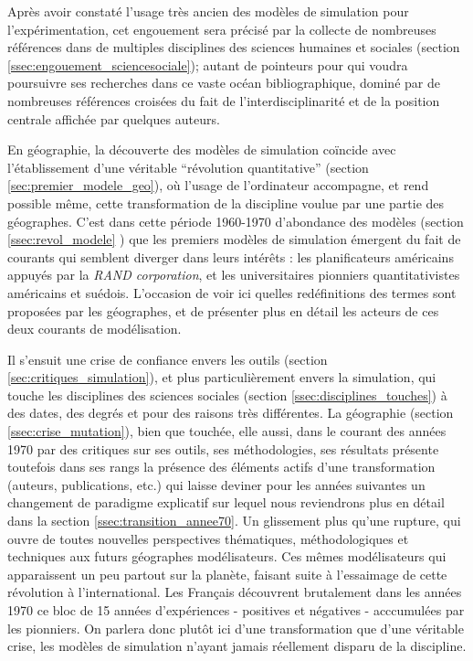Après avoir constaté l'usage très ancien des modèles de simulation pour l'expérimentation, cet engouement sera précisé par la collecte de nombreuses références dans de multiples disciplines des sciences humaines et sociales (section \ref{ssec:engouement_sciencesociale}); autant de pointeurs pour qui voudra poursuivre ses recherches dans ce vaste océan bibliographique, dominé par de nombreuses références croisées du fait de l'interdisciplinarité et de la position centrale affichée par quelques auteurs.

En géographie, la découverte des modèles de simulation coïncide avec l'établissement d'une véritable \enquote{révolution quantitative} (section \ref{sec:premier_modele_geo}), où l'usage de l'ordinateur accompagne, et rend possible même, cette transformation de la discipline voulue par une partie des géographes. C'est dans cette période 1960-1970 d'abondance des modèles (section \ref{ssec:revol_modele} ) que les premiers modèles de simulation émergent du fait de courants qui semblent diverger dans leurs intérêts : les planificateurs américains appuyés par la \textit{RAND corporation}, et les universitaires pionniers quantitativistes américains et suédois. L'occasion de voir ici quelles redéfinitions des termes sont proposées par les géographes, et de présenter plus en détail les acteurs de ces deux courants de modélisation.

Il s'ensuit une crise de confiance envers les outils  (section \ref{sec:critiques_simulation}), et plus particulièrement envers la simulation, qui touche les disciplines des sciences sociales (section \ref{ssec:disciplines_touches}) à des dates, des degrés et pour des raisons très différentes. La géographie (section \ref{ssec:crise_mutation}), bien que touchée, elle aussi, dans le courant des années 1970 par des critiques sur ses outils, ses méthodologies, ses résultats présente toutefois dans ses rangs la présence des éléments actifs d'une transformation (auteurs, publications, etc.) qui laisse deviner pour les années suivantes un changement de paradigme explicatif sur lequel nous reviendrons plus en détail dans la section \ref{ssec:transition_annee70}. Un glissement plus qu'une rupture, qui ouvre de toutes nouvelles perspectives thématiques, méthodologiques et techniques aux futurs géographes modélisateurs. Ces mêmes modélisateurs qui apparaissent un peu partout sur la planète, faisant suite à l'essaimage de cette révolution à l'international. Les Français découvrent brutalement dans les années 1970 ce bloc de 15 années d'expériences - positives et négatives - acccumulées par les pionniers. On parlera donc plutôt ici d'une transformation que d'une véritable crise, les modèles de simulation n'ayant jamais réellement disparu de la discipline.

